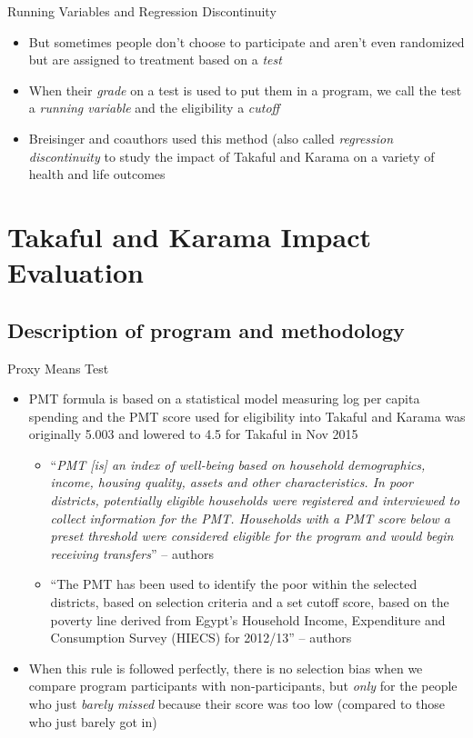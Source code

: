\documentclass{beamer}
\begin{document}
\begin{frame}{Running Variables and Regression Discontinuity}
\begin{itemize}
\item But sometimes people don't choose to participate and aren't even randomized but are assigned to treatment based on a \emph{test}
\item When their \emph{grade} on a test is used to put them in a program, we call the test a \emph{running variable} and the eligibility a \emph{cutoff}
\item  Breisinger and coauthors used this method (also called \emph{regression discontinuity} to study the impact of Takaful and Karama on a variety of health and life outcomes
\end{itemize}
\end{frame}



\section{Takaful and Karama Impact Evaluation}

\subsection{Description of program and methodology}

\begin{frame}{Proxy Means Test}
\begin{itemize}
\item PMT formula is based on a statistical model measuring log per capita spending and the PMT score used for eligibility into Takaful and Karama was originally 5.003 and lowered to 4.5 for Takaful in Nov 2015
	\begin{itemize}
	\tiny
\item ``\emph{PMT [is] an index of well-being based on household demographics, income,
housing quality, assets and other characteristics. In poor districts, potentially eligible households
were registered and interviewed to collect information for the PMT. Households with a PMT score
below a preset threshold were considered eligible for the program and would begin receiving
transfers}'' -- authors
\item ``The PMT has been used to identify
the poor within the selected districts, based on selection criteria and a set cutoff score, based on the
poverty line derived from Egypt’s Household Income, Expenditure and Consumption Survey (HIECS)
for 2012/13'' -- authors
	\end{itemize}
\item When this rule is followed perfectly, there is no selection bias when we compare program participants with non-participants, but \emph{only} for the people who just \emph{barely missed} because their score was too low (compared to those who just barely got in)
\end{itemize}
\end{frame}
\end{document}
